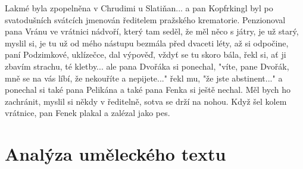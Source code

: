 \documentclass[11pt]{article}
\begin{document}
Lakmé byla zpopelněna v Chrudimi u Slatiňan... a pan Kopfrkingl byl po svatodušních svátcích jmenován ředitelem pražského krematorie. Penzionoval pana Vránu ve vrátnici nádvoří, který tam seděl, že měl něco s játry, je už starý, myslil si, je tu už od mého nástupu bezmála před dvaceti léty, až si odpočine, paní Podzimkové, uklízečce, dal výpověď, vždyť se tu skoro bála, řekl si, ať ji zbavím strachu, té kletby... ale pana Dvořáka si ponechal, "víte, pane Dvořák, mně se na vás líbí, že nekouříte a nepijete..." řekl mu, "že jste abstinent..." a ponechal si také pana Pelikána a také pana Fenka si ještě nechal. Měl bych ho zachránit, myslil si někdy v ředitelně, sotva se drží na nohou. Když šel kolem vrátnice, pan Fenek plakal a zalézal jako pes.
    \section*{Analýza uměleckého textu}
\end{document}
